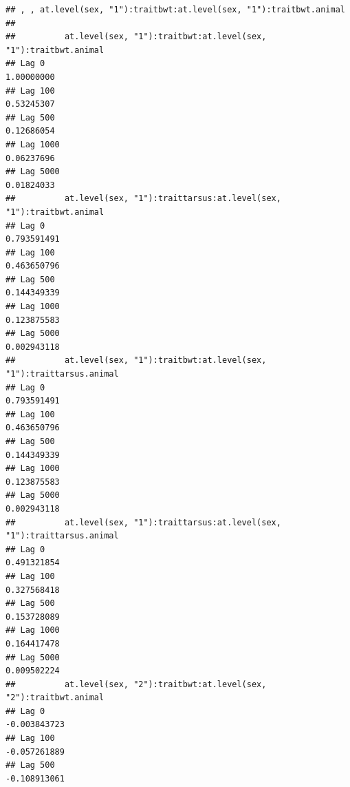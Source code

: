 \documentclass[
  12pt,
]{book}
\newenvironment{Shaded}{\begin{snugshade}}{\end{snugshade}}
\newcommand{\FloatTok}[1]{\textcolor[rgb]{0.00,0.00,0.81}{#1}}
\newcommand{\KeywordTok}[1]{\textcolor[rgb]{0.13,0.29,0.53}{\textbf{#1}}}
\newcommand{\NormalTok}[1]{#1}
\newcommand{\OperatorTok}[1]{\textcolor[rgb]{0.81,0.36,0.00}{\textbf{#1}}}
\begin{document}
\begin{Shaded}
\end{Shaded}

\begin{verbatim}
## , , at.level(sex, "1"):traitbwt:at.level(sex, "1"):traitbwt.animal
## 
##          at.level(sex, "1"):traitbwt:at.level(sex, "1"):traitbwt.animal
## Lag 0                                                        1.00000000
## Lag 100                                                      0.53245307
## Lag 500                                                      0.12686054
## Lag 1000                                                     0.06237696
## Lag 5000                                                     0.01824033
##          at.level(sex, "1"):traittarsus:at.level(sex, "1"):traitbwt.animal
## Lag 0                                                          0.793591491
## Lag 100                                                        0.463650796
## Lag 500                                                        0.144349339
## Lag 1000                                                       0.123875583
## Lag 5000                                                       0.002943118
##          at.level(sex, "1"):traitbwt:at.level(sex, "1"):traittarsus.animal
## Lag 0                                                          0.793591491
## Lag 100                                                        0.463650796
## Lag 500                                                        0.144349339
## Lag 1000                                                       0.123875583
## Lag 5000                                                       0.002943118
##          at.level(sex, "1"):traittarsus:at.level(sex, "1"):traittarsus.animal
## Lag 0                                                             0.491321854
## Lag 100                                                           0.327568418
## Lag 500                                                           0.153728089
## Lag 1000                                                          0.164417478
## Lag 5000                                                          0.009502224
##          at.level(sex, "2"):traitbwt:at.level(sex, "2"):traitbwt.animal
## Lag 0                                                      -0.003843723
## Lag 100                                                    -0.057261889
## Lag 500                                                    -0.108913061

\end{verbatim}
\end{document}
